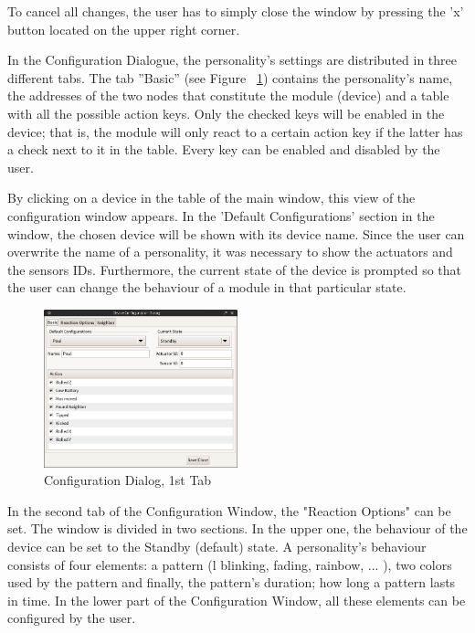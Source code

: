 To cancel all changes, the user has to simply close the window by pressing the 'x' button located on the upper right corner.   

In the Configuration Dialogue, the personality's settings are distributed in three different tabs. The tab ''Basic'' (see Figure ~\ref{fig:java-server-config01}) contains the personality's name, the addresses of the two nodes that constitute the module (device) and a table with all the possible action keys. Only the checked keys will be enabled in the device; that is, the module will only react to a certain action key if the latter has a check next to it in the table. Every key can be enabled and disabled by the user. 

By clicking on a device in the table of the main window, this view of the configuration window appears. In the 'Default Configurations' section in the window, the chosen device will be shown with its device name. Since the user can overwrite the name of a personality, it was necessary to show the actuators and the sensors IDs. Furthermore, the current state of the device is prompted so that the user can change the behaviour of a module in that particular state. 


\begin{figure}[h!]
 \centering
 \includegraphics[width= 0.5\textwidth, clip=true  ,keepaspectratio=true]{./pic/java-server-config01.png}
 \caption{Configuration Dialog, 1st Tab}
 \label{fig:java-server-config01}
\end{figure}

In the second tab of the Configuration Window, the "Reaction Options" can be set.
The window is divided in two sections. In the upper one, the behaviour of the device can be set to the Standby (default) state. A personality's behaviour consists of four elements: a pattern (l blinking, fading, rainbow, ... ), two colors used by the pattern and finally, the pattern's duration; how long a pattern lasts in time.
In the lower part of the Configuration Window, all these elements can be configured by the user.

